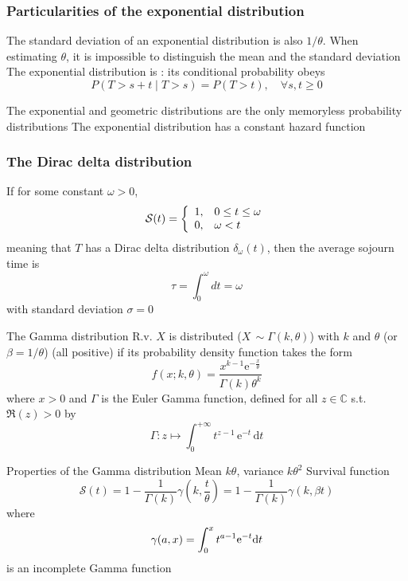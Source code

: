\documentclass[aspectratio=169]{beamer}\usepackage[]{graphicx}\usepackage[]{xcolor}
\begin{document}
\begin{frame}\frametitle{Particularities of the exponential distribution}
The standard deviation of an exponential distribution is also $1/\theta$. When estimating $\theta$, it is impossible to distinguish the mean and the standard deviation
\vfill
The exponential distribution is : its conditional probability obeys
\[
P(T > s + t\; |\; T > s) = P(T > t),\quad\forall s, t \ge 0
\]

The exponential and geometric distributions are the only memoryless probability distributions
\vfill
The exponential distribution has a constant hazard function
\end{frame}

\begin{frame}\frametitle{The Dirac delta distribution}
If for some constant $\omega>0$,
\[
\S(t)=
\left\{
\begin{array}{ll}
1, & 0\leq t\leq\omega \\
0, & \omega<t
\end{array}
\right.
\]
meaning that $T$ has a Dirac delta distribution
$\delta_\omega(t)$, then the average sojourn time is
\[
\tau=\int_0^\omega dt=\omega
\]
with standard deviation $\sigma=0$
\end{frame}

\begin{frame}{The Gamma distribution}
R.v. $X$ is  distributed ($X\,\sim\Gamma(k, \theta)$) with  $k$ and  $\theta$ (or  $\beta = 1/\theta$) (all positive) if its probability density function takes the form
\begin{equation}\label{eq:gamma_distrib}
f(x;k,\theta) = \frac{x^{k-1} \mathrm{e}^{-\frac{x}{\theta}}}{\Gamma ( k)\theta ^k}
\end{equation}
where $x>0$ and $\Gamma$ is the Euler Gamma function, defined for all $z\in\mathbb{C}$ s.t. $\Re(z) > 0$ by
\[
\Gamma : z \mapsto \int_0^{+\infty}  t^{z-1}\,\mathrm{e}^{-t}\,\mathrm{d}t
\]
\end{frame}

\begin{frame}{Properties of the Gamma distribution}
Mean $k\theta$, variance $k\theta^2$
\vfill
Survival function
\[
\mathcal{S}(t)=
1-\frac{1}{\Gamma(k)}\gamma\left(
k,\frac{t}{\theta} 
\right)
=1-\frac{1}{\Gamma(k)}\gamma\left(
k,\beta t
\right)
\]
where 
\[
\gamma(a,x)=\int_0^x t^{a-1}{\rm e}^{-t}{\rm d}t
\]
is an incomplete Gamma function
\end{frame}
\end{document}
